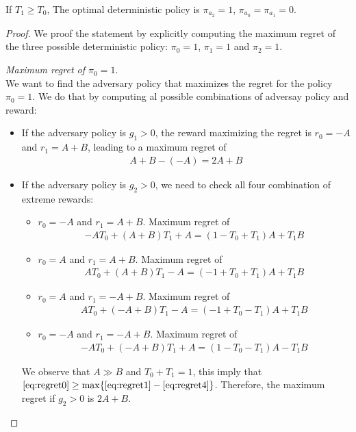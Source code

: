 \begin{proposition}\label{theorem:opt_det}
If $T_1\geq T_0$, The optimal deterministic policy is $\pi_{a_2}=1$, $\pi_{a_0}=\pi_{a_1}=0$. 
\end{proposition}
\begin{proof}
We proof the statement by explicitly computing the maximum regret of the three possible deterministic policy: $\pi_0=1$, $\pi_1=1$ and $\pi_2=1$.



\textit{Maximum regret of $\pi_0=1$}.\\
We want to find the adversary policy that maximizes the regret for the policy $\pi_0=1$. We do that by computing al possible combinations of adversay policy and reward:
\begin{itemize}
\item If the adversary policy is $g_1> 0$, the reward maximizing the regret is $r_0 = -A$ and $r_1 = A+B$, leading to a maximum regret of 
\begin{align}
A+B-(-A)=2A+B \label{eq:regret0}
\end{align}
\item If the adversary policy is $g_2>0$, we need to check all four combination of extreme rewards:
\begin{itemize}
\item $r_0 = -A$ and $r_1= A+B$. Maximum regret of
\begin{align}
-A T_0 + (A+B)T_1 + A = (1-T_0 + T_1)A + T_1 B \label{eq:regret1}
\end{align}
\item $r_0 = A$ and $r_1= A+B$. Maximum regret of
\begin{align}
A T_0 + (A+B)T_1 - A = (-1+T_0 + T_1)A + T_1 B  \label{eq:regret2}
\end{align}
\item $r_0 = A$ and $r_1= -A+B$. Maximum regret of
\begin{align} 
A T_0 + (-A+B)T_1 - A =  (-1+T_0 - T_1)A + T_1 B \label{eq:regret3}
\end{align}
\item $r_0 = -A$ and $r_1= -A+B$. Maximum regret of
\begin{align}
-A T_0 + (-A+B)T_1 + A =  (1 - T_0 - T_1)A - T_1 B \label{eq:regret4}
\end{align}
\end{itemize} 
We observe that $A\gg B$ and $T_0+T_1= 1$, this imply that  $\eqref{eq:regret0} \geq \max\{\eqref{eq:regret1}-\eqref{eq:regret4} \}$. Therefore, the maximum regret if $g_2>0$ is $2A+B$.
\end{itemize} 





\end{proof}
